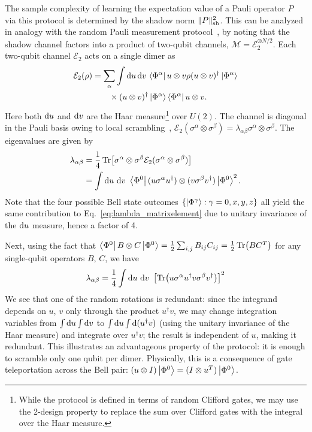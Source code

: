 \documentclass[a4paper,twocolumns,11pt,accepted=2024-03-04]{quantumarticle}
\newcommand{\shadownorm}[1]{\ensuremath{\| #1 \|_{\rm sh}}}
\begin{document}
The sample complexity of learning the expectation value of a Pauli operator $P$ via this protocol is determined by the shadow norm $\shadownorm{P}^2$.
This can be analyzed in analogy with the random Pauli measurement protocol~\cite{huang_predicting_2020}, by noting that the shadow channel factors into a product of two-qubit channels, $\mathcal{M} = \mathcal{E}_2^{\otimes N/2}$.
Each two-qubit channel $\mathcal{E}_2$ acts on a single dimer as
\begin{align}
    \mathcal{E}_2(\rho) 
    & = \sum_\alpha \int{\rm d}u\, {\rm d}v\, 
    \bra{\Phi^\alpha}u\otimes v \rho (u \otimes v)^\dagger \ket{\Phi^\alpha} \nonumber \\
    & \qquad \times (u \otimes v)^\dagger \ket{\Phi^\alpha}\bra{\Phi^\alpha} u\otimes v.
\end{align}
Here both ${\rm d}u$ and ${\rm d}v$ are the Haar measure\footnote{While the protocol is defined in terms of random Clifford gates, we may use the 2-design property to replace the sum over Clifford gates with the integral over the Haar measure.} over $U(2)$. 
The channel is diagonal in the Pauli basis owing to local scrambling~\cite{akhtar_scalable_2023,bertoni_shallow_2022}, $\mathcal{E}_2(\sigma^\alpha\otimes \sigma^\beta) = \lambda_{\alpha\beta} \sigma^\alpha \otimes \sigma^\beta$. The eigenvalues are given by
\begin{align}
    \lambda_{\alpha \beta}
    & = \frac{1}{4} \Tr[\sigma^\alpha \otimes \sigma^\beta \mathcal{E}_2(\sigma^\alpha\otimes \sigma^\beta)] \nonumber \\
    & = \int{\rm d}u\ {\rm d}v\ \bra{\Phi^0}(u\sigma^\alpha u^\dagger) \otimes (v\sigma^\beta v^\dagger) \ket{\Phi^0}^2. \label{eq:lambda_matrixelement}
\end{align}
Note that the four possible Bell state outcomes $\{\ket{\Phi^\gamma}:\gamma=0,x,y,z\}$ all yield the same contribution to Eq.~\eqref{eq:lambda_matrixelement} due to unitary invariance of the ${\rm d}u$ measure, hence a factor of 4.

Next, using the fact that $\bra{\Phi^0} B\otimes C\ket{\Phi^0} = \frac{1}{2}\sum_{i,j} B_{ij} C_{ij} = \frac{1}{2} \Tr(BC^T)$ for any single-qubit operators $B$, $C$, we have
\begin{equation}
    \lambda_{\alpha \beta} 
    = \frac{1}{4} \int{\rm d}u\ {\rm d}v\ \left[\Tr(u\sigma^\alpha u^\dagger v \sigma^\beta v^\dagger) \right]^2 \label{eq:lambda_integral}
\end{equation}
We see that one of the random rotations is redundant: 
since the integrand depends on $u$, $v$ only through the product $u^\dagger v$, we may change integration variables from $\int {\rm d}u\int {\rm d}v$ to $\int {\rm d}u\int {\rm d}(u^\dagger v)$ (using the unitary invariance of the Haar measure) and integrate over $u^\dagger v$; the result is independent of $u$, making it redundant.
This illustrates an advantageous property of the protocol: it is enough to scramble only one qubit per dimer.
Physically, this is a consequence of gate teleportation across the Bell pair: $(u\otimes I)\ket{\Phi^0} = (I\otimes u^T)\ket{\Phi^0}$.
\end{document}
